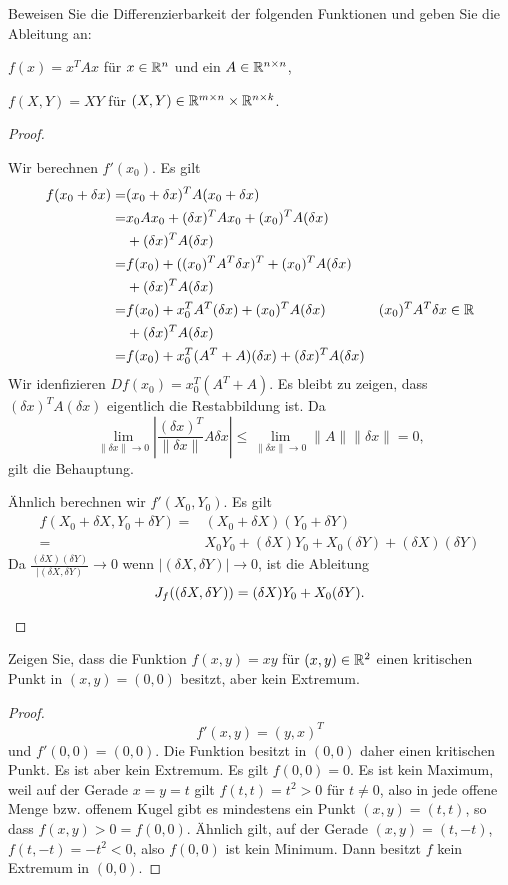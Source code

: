 \begin{Problem}
Beweisen Sie die Differenzierbarkeit der folgenden Funktionen und geben Sie die Ableitung an:	
\begin{parts}
\item $f(x)=x^TAx$ f\"{u}r $x\in \mathbb{R}^n$ und ein $A\in \mathbb{R}^{n\times n}$,
\item $f(X,Y)=XY$ f\"{u}r $(X,Y)\in \mathbb{R}^{m\times n}\times \mathbb{R}^{n\times k}$.
\end{parts}
\end{Problem}
\begin{proof}
	\begin{parts}
	\item Wir berechnen $f'(x_0)$. Es gilt
		\begin{align*}
			f(x_0+\delta x)=&(x_0+\delta x)^T A(x_0+\delta x)\\
			=&x_0Ax_0+(\delta x)^TAx_0+(x_0)^TA(\delta x)\\
			 &+(\delta x)^T A(\delta x)\\
			=&f(x_0)+((x_0)^TA^T\delta x)^T+(x_0)^TA(\delta x)\\
			 &+(\delta x)^T A(\delta x)\\
			=&f(x_0)+x_0^T A^T(\delta x)+(x_0)^TA(\delta x) & (x_0)^TA^T \delta x\in \mathbb{R}\\
			 &+(\delta x)^TA(\delta x)\\
			=&f(x_0)+x_0^T(A^T+A)(\delta x)+(\delta x)^T A(\delta x)
		\end{align*}
		Wir idenfizieren $Df(x_0)=x_0^T(A^T+A)$. Es bleibt zu zeigen, dass $(\delta x)^T A(\delta x)$ eigentlich die Restabbildung ist. Da
		\[
			\lim_{\|\delta x\| \to 0} \left|\frac{(\delta x)^T}{\|\delta x\|} A\delta x\right|\le\lim_{\|\delta x\| \to 0} \|A\| \|\delta x\|=0
		,\]
		gilt die Behauptung.
	\item Ähnlich berechnen wir $f'(X_0,Y_0)$. Es gilt
		\begin{align*}
			f(X_0+\delta X, Y_0+\delta Y)=&(X_0+\delta X)(Y_0+\delta Y)\\
			=&X_0Y_0+(\delta X)Y_0+X_0(\delta Y)+(\delta X)(\delta Y)
		\end{align*}
		Da $\frac{(\delta X)(\delta Y)}{|(\delta X, \delta Y)}\to 0$ wenn $|(\delta X, \delta Y)|\to 0$, ist die Ableitung
		\[
		J_f((\delta X, \delta Y))=(\delta X)Y_0+X_0(\delta Y)
		.\qedhere\] 
	\end{parts}
\end{proof}

\begin{Problem}
	Zeigen Sie, dass die Funktion $f(x,y)=xy$ f\"{u}r $(x,y)\in \mathbb{R}^2$ einen kritischen Punkt in $(x,y)=(0,0)$ besitzt, aber kein Extremum.
\end{Problem}
\begin{proof}
	\[
	f'(x,y)=(y,x)^T
\]
und $f'(0,0)=(0,0)$. Die Funktion besitzt in $(0,0)$ daher einen kritischen Punkt. Es ist aber kein Extremum. Es gilt $f(0,0)=0$. Es ist kein Maximum, weil auf der Gerade $x=y=t$ gilt $f(t,t)=t^2>0$ f\"{u}r $t\neq 0$, also in jede offene Menge bzw. offenem Kugel gibt es mindestens ein Punkt $(x,y)=(t,t)$, so dass $f(x,y)>0=f(0,0)$. Ähnlich gilt, auf der Gerade $(x,y)=(t,-t)$, $f(t,-t)=-t^2<0$, also $f(0,0)$ ist kein Minimum. Dann  besitzt $f$ kein Extremum in $(0,0)$.
\end{proof}
